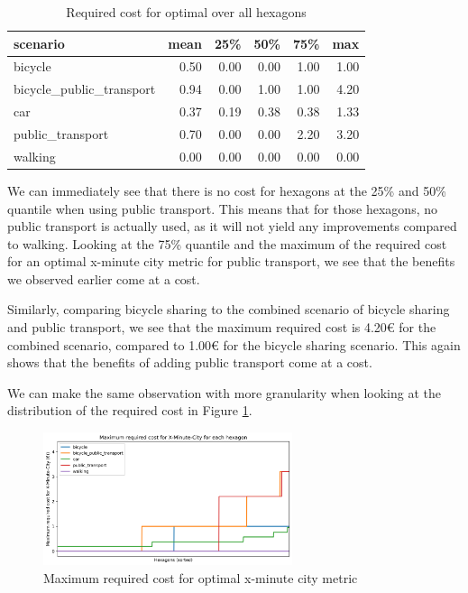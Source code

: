 \begin{table}
  \caption{Required cost for optimal over all hexagons}
  \label{tab:required_cost}
  \begin{center}
    \begin{tabular}{|l|r|r|r|r|r|}
    \hline
    scenario & mean & 25\% & 50\% & 75\% & max \\
    \hline
    bicycle & 0.50 & 0.00 & 0.00 & 1.00 & 1.00 \\
    \hline
    bicycle_public_transport & 0.94 & 0.00 & 1.00 & 1.00 & 4.20 \\
    \hline
    car & 0.37 & 0.19 & 0.38 & 0.38 & 1.33 \\
    \hline
    public_transport & 0.70 & 0.00 & 0.00 & 2.20 & 3.20 \\
    \hline
    walking & 0.00 & 0.00 & 0.00 & 0.00 & 0.00 \\
    \hline
    \end{tabular}
  \end{center}
\end{table}

We can immediately see that there is no cost for hexagons at the 25\% and 50\% quantile when using public transport.
This means that for those hexagons, no public transport is actually used, as it will not yield any improvements compared to walking.
Looking at the 75\% quantile and the maximum of the required cost for an optimal x-minute city metric for public transport, we see that the benefits we observed earlier come at a cost.

Similarly, comparing bicycle sharing to the combined scenario of bicycle sharing and public transport, we see that the maximum required cost is 4.20€ for the combined scenario, compared to 1.00€ for the bicycle sharing scenario.
This again shows that the benefits of adding public transport come at a cost.

We can make the same observation with more granularity when looking at the distribution of the required cost in Figure \ref{fig:maximum_required_cost_for_x_minute_city}.

\begin{figure}
  \begin{center}
    \includegraphics[width=0.65\textwidth]{Figures/results/maximum_required_cost_for_x_minute_city}
  \end{center}
  \caption{Maximum required cost for optimal x-minute city metric}
  \label{fig:maximum_required_cost_for_x_minute_city}
\end{figure}

